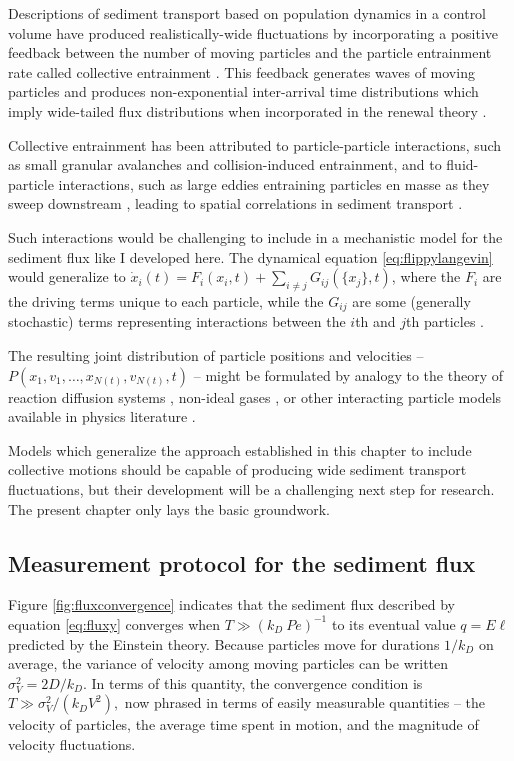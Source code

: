 Descriptions of sediment transport based on population dynamics in a control volume have produced realistically-wide fluctuations by incorporating a positive feedback between the number of moving particles and the particle entrainment rate called collective entrainment \citep{Ancey2008,Ancey2014}.
This feedback generates waves of moving particles \citep{Ancey2014, Heyman2015} and produces non-exponential inter-arrival time distributions \citep{Heyman2013} which imply wide-tailed flux distributions when incorporated in the renewal theory \citep[e.g.][]{Turowski2010,Ancey2020}.

Collective entrainment has been attributed to particle-particle interactions, such as small granular avalanches and collision-induced entrainment, and to fluid-particle interactions, such as large eddies \citep[e.g.][]{Cameron2020} entraining particles en masse as they sweep downstream \citep{Ancey2014,Lee2018}, leading to spatial correlations in sediment transport \citep{Heyman2014}.

Such interactions would be challenging to include in a mechanistic model for the sediment flux like I developed here. 
The dynamical equation \ref{eq:flippylangevin} would generalize to $\dot{x}_i(t) = F_i(x_i,t) + \sum_{i\neq j}G_{ij}(\{x_j\},t)$, where the $F_i$ are the driving terms unique to each particle, while the $G_{ij}$ are some (generally stochastic) terms representing interactions between the $i$th and $j$th particles \citep{Goldstein1997}.

The resulting joint distribution of particle positions and velocities -- $P(x_1,v_1,\dots,x_{N(t)},v_{N(t)},t)$ -- might be formulated by analogy to the theory of reaction diffusion systems \citep{Pechenik1999, Cardy2008}, non-ideal gases \citep{Chapman1970,Brilliantov2004}, or other interacting particle models available in physics literature \citep{Hernandez2004,Escaff2018}.

Models which generalize the approach established in this chapter to include collective motions should be capable of producing wide sediment transport fluctuations, but their development will be a challenging next step for research. The present chapter only lays the basic groundwork.

\subsection{Measurement protocol for the sediment flux}

Figure \ref{fig:fluxconvergence} indicates that the sediment flux described by equation \ref{eq:fluxy} converges when $T\gg (k_D\ Pe)^{-1}$ to its eventual value $q = E\ell$ predicted by the Einstein theory.
Because particles move for durations $1/k_D$ on average, the variance of velocity among moving particles can be written $\sigma_V^2 = 2D/k_D$. In terms of this quantity, the convergence condition is  $T\gg \sigma_V^2/(k_D V^2),$ now phrased in terms of easily measurable quantities -- the velocity of particles, the average time spent in motion, and the magnitude of velocity fluctuations.

